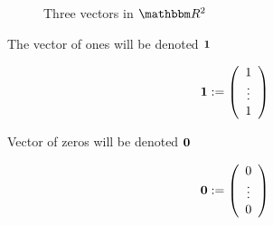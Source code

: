 \begin{frame}

    \begin{figure}
       \begin{center}
        \caption{Three vectors in $\RR^2$ }
       \end{center}
    \end{figure}

\end{frame}


\begin{frame}

    \vspace{2em}
    The vector of ones will be denoted ${\mathbf 1}$ 
    
    \begin{equation*}
        {\mathbf 1} := 
        \left(
        \begin{array}{c}
            1 \\
            \vdots \\
            1
        \end{array}
        \right)
    \end{equation*}

    Vector of zeros will be denoted ${\mathbf 0}$

    \begin{equation*}
        {\mathbf 0} := 
        \left(
        \begin{array}{c}
            0 \\
            \vdots \\
            0
        \end{array}
        \right)
    \end{equation*}

\end{frame}


